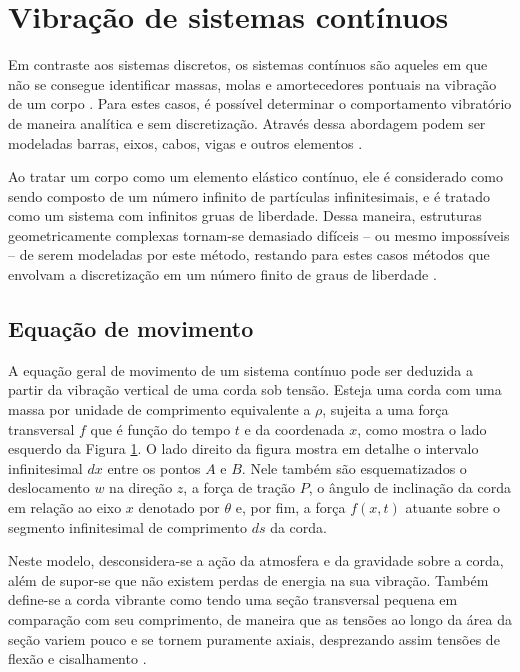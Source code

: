 \documentclass[12pt,openright,oneside,a4paper,
	chapter=TITLE,section=TITLE,
	english,brazil]{abntex2}
\begin{document}
	\section{Vibração de sistemas contínuos}
	Em contraste aos sistemas discretos, os sistemas contínuos são aqueles em que não se consegue identificar massas, molas e amortecedores pontuais na vibração de um corpo \cite{rao:2008}. Para estes casos, é possível determinar o comportamento vibratório de maneira analítica e sem discretização. Através dessa abordagem podem ser modeladas barras, eixos, cabos, vigas e outros elementos \cite{timoshenko:1974}. 
	
	Ao tratar um corpo como um elemento elástico contínuo, ele é considerado como sendo composto de um número infinito de partículas infinitesimais, e é tratado como um sistema com infinitos gruas de liberdade. Dessa maneira, estruturas geometricamente complexas tornam-se demasiado difíceis -- ou mesmo impossíveis -- de serem modeladas por este método, restando para estes casos métodos que envolvam a discretização em um número finito de graus de liberdade \cite{timoshenko:1974}.
	
	\subsection{Equação de movimento} \label{desenv:cont:eqn-geral}
	A equação geral de movimento de um sistema contínuo pode ser deduzida a partir da vibração vertical de uma corda sob tensão. Esteja uma corda com uma massa por unidade de comprimento equivalente a $\rho$, sujeita a uma força transversal $f$ que é função do tempo $t$ e da coordenada $x$, como mostra o lado esquerdo da Figura \ref{fig:vibracao-corda}. O lado direito da figura mostra em detalhe o intervalo infinitesimal $dx$ entre os pontos $A$ e $B$. Nele também são esquematizados o deslocamento $w$ na direção $z$, a força de tração $P$, o ângulo de inclinação da corda em relação ao eixo $x$ denotado por $\theta$ e, por fim, a força $f(x,t)$ atuante sobre o segmento infinitesimal de comprimento $ds$ da corda.
	\begin{figure}[t] 
	 \label{fig:vibracao-corda}
	\end{figure}

	Neste modelo, desconsidera-se a ação da atmosfera e da gravidade sobre a corda, além de supor-se que não existem perdas de energia na sua vibração. Também define-se a corda vibrante como tendo uma seção transversal pequena em comparação com seu comprimento, de maneira que as tensões ao longo da área da seção variem pouco e se tornem puramente axiais, desprezando assim tensões de flexão e cisalhamento \cite{clark:1972}.
	
\end{document}
